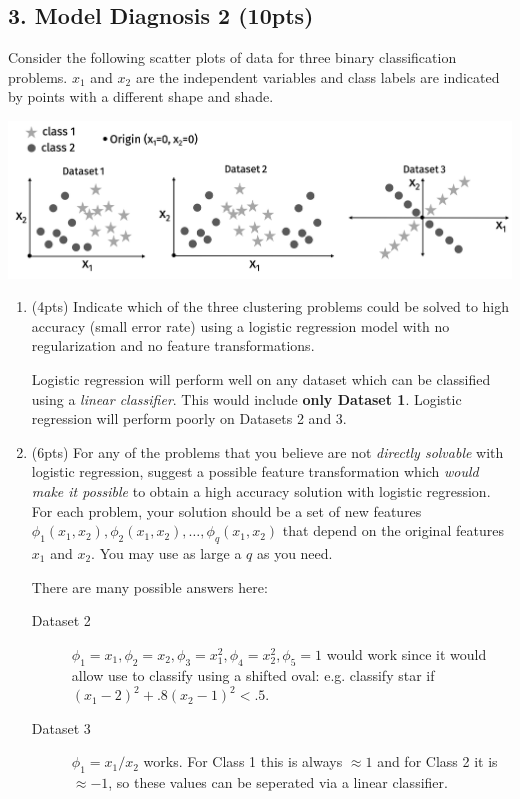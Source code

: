 \documentclass[10pt]{article}
\begin{document}
\newpage
\subsection{3. Model Diagnosis 2 (\textbf{\small 10pts})}
Consider the following scatter plots of data for three binary classification problems. $x_1$ and $x_2$ are the independent variables and class labels are indicated by points with a different shape and shade.

\includegraphics[width=\textwidth]{examp_datasets.png}



\begin{enumerate}[label=(\alph*)]
	\item (4pts) Indicate which of the three clustering problems could be solved to high accuracy (small error rate) using a logistic regression model with no regularization and no feature transformations. 
	
	\vspace{1em}
	\color{blue}
	Logistic regression will perform well on any dataset which can be classified using a \emph{linear classifier}. This would include \textbf{only Dataset 1}. Logistic regression will perform poorly on Datasets 2 and 3.
	\color{black}
	\vspace{1em}
	
	\item (6pts) For any of the problems that you believe are not \emph{directly solvable} with logistic regression, suggest a possible feature transformation which \emph{would make it possible} to obtain a high accuracy solution with logistic regression. For each problem, your solution should be a set of new features $\phi_1(x_1,x_2), \phi_2(x_1,x_2), \ldots, \phi_q(x_1,x_2)$ that depend on the original features $x_1$ and $x_2$. You may use as large a $q$ as you need.
	
	\vspace{1em}
	\color{blue}
	There are many possible answers here:
	\begin{description}
		\item[Dataset 2] $\phi_1= x_1, \phi_2= x_2, \phi_3 = x_1^2, \phi_4 = x_2^2, \phi_5 = 1$ would work since it would allow use to classify using a shifted oval: e.g. classify star if $(x_1 - 2)^2 + .8(x_2 - 1)^2 < .5$. 
		\item[Dataset 3] $\phi_1 = x_1/x_2$ works. For Class 1 this is always $\approx 1$ and for Class 2 it is $\approx -1$, so these values can be seperated via a linear classifier. 
		
	\end{description}
	\color{black}
	\vspace{1em}


\end{enumerate}
\end{document}
